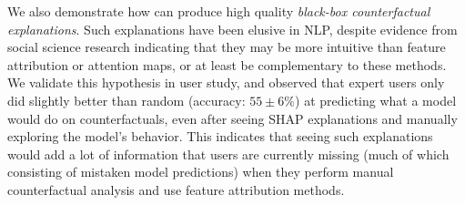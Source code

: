 We also demonstrate how \sysname can produce high quality \emph{black-box counterfactual explanations}.
Such explanations have been elusive in NLP, despite evidence from social science research \cite{miller} indicating that they may be more intuitive than feature attribution or attention maps, or at least be complementary to these methods. 
We validate this hypothesis in user study, and observed that expert users only did slightly better than random (accuracy: $55 \pm 6\%$) at predicting what a model would do on \sysname counterfactuals, even after seeing SHAP explanations \cite{NIPS2017_7062} and manually exploring the model's behavior. 
This indicates that seeing such explanations would add a lot of information that users are currently missing (much of which consisting of mistaken model predictions) when they perform manual counterfactual analysis and use feature attribution methods.


